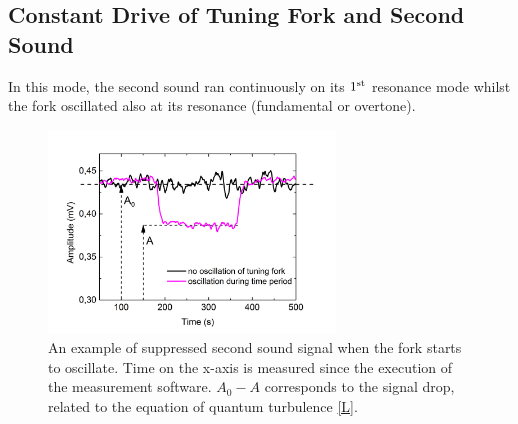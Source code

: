 \subsection*{Constant Drive of Tuning Fork and Second Sound}

In this mode, the second sound ran continuously on its $ 1^{\mathrm{st}} $ resonance mode whilst the fork oscillated also at its resonance (fundamental or overtone).

\begin{figure}[h]
	\centering
	\vspace{-0.5cm}
	\includegraphics[width=0.68\textwidth]{graphs/example}
	\caption{An example of suppressed second sound signal when the fork starts to oscillate. Time on the x-axis is measured since the execution of the measurement software. $ A_0-A$ corresponds to the signal drop, related to the equation of quantum turbulence \ref{L}.}
\end{figure}

\newpage
